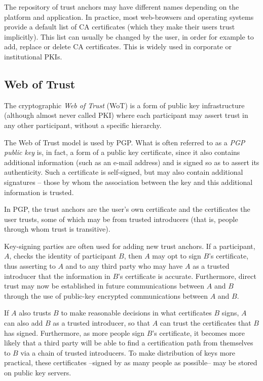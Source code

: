 \documentclass{llncs}
\begin{document}
The repository of trust anchors may have different names depending on
the platform and application. In practice, most web-browsers and
operating systems provide a default list of CA certificates (which
they make their users trust implicitly). This list can usually be changed
by the user, in order for example to add, replace or delete CA certificates. This
is widely used in corporate or institutional PKIs.

\subsection{Web of Trust}
\label{sec:wot}

The cryptographic {\em Web of Trust} (WoT) is a form of public key
infrastructure (although almost never called PKI) where each
participant may assert trust in any other participant, without a
specific hierarchy.

The Web of Trust model is used by PGP. What is often referred to as a
{\em PGP public key} is, in fact, a form of a public key certificate,
since it also contains additional information (such as an e-mail
address) and is signed so as to assert its authenticity. Such a
certificate is self-signed, but may also contain additional signatures
-- those by whom the association between the key and this additional
information is trusted.

In PGP, the trust anchors are the user's own certificate and the
certificates the user trusts, some of which may be from trusted
introducers (that is, people through whom trust is transitive).

Key-signing parties are often used for adding new trust anchors.  If a
participant, $A$, checks the identity of participant $B$, then $A$ may
opt to sign $B$'s certificate, thus asserting to $A$ and to any third
party who may have $A$ as a trusted introducer that the information in
$B$'s certificate is accurate.  Furthermore, direct trust may now be
established in future communications between $A$ and $B$ through the
use of public-key encrypted communications between $A$ and $B$.

If $A$ also trusts $B$ to make reasonable decisions in what
certificates $B$ signs, $A$ can also add $B$ as a trusted introducer,
so that $A$ can trust the certificates that $B$ has
signed. Furthermore, as more people sign $B$'s certificate, it becomes
more likely that a third party will be able to find a certification
path from themselves to $B$ via a chain of trusted introducers. To
make distribution of keys more practical, these certificates --signed
by as many people as possible-- may be stored on public key servers.
\end{document}

